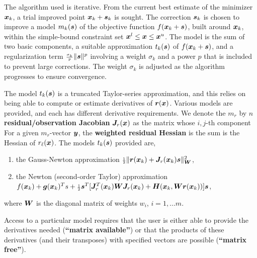 \documentclass{galahad}
\begin{document}

\galterminology
The algorithm used is iterative. From the current best estimate
of the minimizer ${\bm{x}}_k$, a trial improved point ${\bm{x}}_k + {\bm{s}}_k$ is sought.
The correction ${\bm{s}}_k$ is chosen to improve a model $m_k({\bm{s}})$ of
the objective function $f({\bm{x}}_k+{\bm{s}})$, built around ${\bm{x}}_k$, within the 
simple-bound constraint set ${\bm{x}}^l \leq {\bm{x}} \leq {\bm{x}}^u$.
The model is the sum of two basic components,
a suitable approximation $t_k({\bm{s}})$ of $f({\bm{x}}_k+{\bm{s}})$,
and a regularization term ${\scriptstyle \frac{\sigma_k}{p}} \|{\bm{s}}\|^p$
involving a weight $\sigma_k$ and a power $p$
that is included to prevent large corrections.
The weight  $\sigma_k$ is adjusted as the algorithm progresses to
ensure convergence.

The model $t_k({\bm{s}})$ is a truncated Taylor-series approximation, and this
relies on being able to compute or estimate derivatives of ${\bm{r}}({\bm{x}})$.
Various models are provided, and each has different derivative requirements.
We denote the $m_r$ by $n$ {\bf residual/observation Jacobian} 
${\bm{J}}_r({\bm{x}})$ as the matrix whose $i,j$-th component
For a given $m_r$-vector ${\bm{y}}$, the
{\bf weighted residual Hessian} is the sum
is the Hessian of $r_\ell({\bm{x}})$.
The models $t_k({\bm{s}})$ provided are,
\begin{enumerate}
\item the Gauss-Newton approximation
  ${\scriptstyle \frac{1}{2}} \| {\bm{r}}({\bm{x}}_k) + {\bm{J}}_r({\bm{x}}_k) {\bm{s}}\|_{{\bm{W}}}^2$,
\item the Newton (second-order Taylor) approximation
  $f({\bm{x}}_k) + {\bm{g}}({\bm{x}}_k)^T s + {\scriptstyle \frac{1}{2}} {\bm{s}}^T
  [ {\bm{J}}_r^T({\bm{x}}_k) {\bm{W}} {\bm{J}}_r({\bm{x}}_k) + {\bm{H}}({\bm{x}}_k,{\bm{W}} {\bm{r}}({\bm{x}}_k))] {\bm{s}}$,
\end{enumerate}
where ${\bm{W}}$ is the diagonal matrix of weights $w_i$, $i = 1, \ldots m$.

\noindent
Access to a particular model requires that the user is either able to
provide the derivatives needed ({\bf ``matrix available''}) or that the products
of these derivatives (and their transposes) with specified vectors are possible
({\bf ``matrix free''}).
\end{document}

